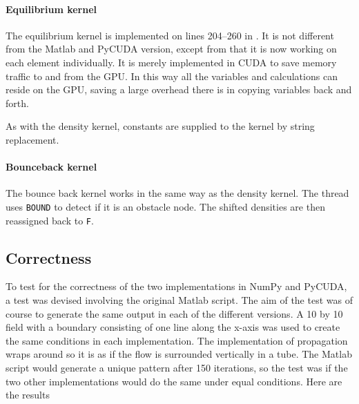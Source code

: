 \paragraph{Equilibrium kernel}
The equilibrium kernel is implemented on lines 204--260 in . It is not different from the Matlab and PyCUDA version, except from that it is now working on each element individually. It is merely implemented in CUDA to save memory traffic to and from the GPU. In this way all the variables and calculations can reside on the GPU, saving a large overhead there is in copying variables back and forth.

As with the density kernel, constants are supplied to the kernel by string replacement.


\paragraph{Bounceback kernel}
The bounce back kernel works in the same way as the density kernel. The thread uses \texttt{BOUND} to detect if it is an obstacle node. The shifted densities are then reassigned back to \texttt{F}.




\subsection{Correctness}
To test for the correctness of the two implementations in NumPy and PyCUDA, a test was devised involving the original Matlab script. The aim of the test was of course to generate the same output in each of the different versions. A 10 by 10 field with a boundary consisting of one line along the x-axis was used to create the same conditions in each implementation. The implementation of propagation wraps around so it is as if the flow is surrounded vertically in a tube. The Matlab script would generate a unique pattern after 150 iterations, so the test was if the two other implementations would do the same under equal conditions. Here are the results

